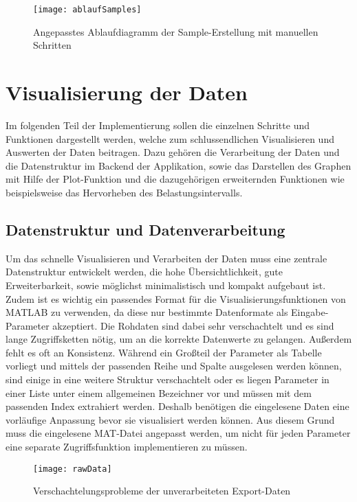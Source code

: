 \begin{figure}[H]
	\centering
	\texttt{[image: ablaufSamples]}
	\caption{Angepasstes Ablaufdiagramm der Sample-Erstellung mit manuellen Schritten}
	\label{fig:ablaufSamples}
\end{figure}

\section{Visualisierung der Daten}

Im folgenden Teil der Implementierung sollen die einzelnen Schritte und Funktionen dargestellt werden, welche zum schlussendlichen Visualisieren und Auswerten der Daten beitragen. Dazu gehören die Verarbeitung der Daten und die Datenstruktur im Backend der Applikation, sowie das Darstellen des Graphen mit Hilfe der Plot-Funktion und die dazugehörigen erweiternden Funktionen wie beispielsweise das Hervorheben des Belastungsintervalls.

\subsection{Datenstruktur und Datenverarbeitung}

Um das schnelle Visualisieren und Verarbeiten der Daten muss eine zentrale Datenstruktur entwickelt werden, die hohe Übersichtlichkeit, gute Erweiterbarkeit, sowie möglichst minimalistisch und kompakt aufgebaut ist. Zudem ist es wichtig ein passendes Format für die Visualisierungsfunktionen von MATLAB zu verwenden, da diese nur bestimmte Datenformate als Eingabe-Parameter akzeptiert. Die Rohdaten sind dabei sehr verschachtelt und es sind lange Zugriffsketten nötig, um an die korrekte Datenwerte zu gelangen. Außerdem fehlt es oft an Konsistenz. Während ein Großteil der Parameter als Tabelle vorliegt und mittels der passenden Reihe und Spalte ausgelesen werden können, sind einige in eine weitere Struktur verschachtelt oder es liegen Parameter in einer Liste unter einem allgemeinen Bezeichner vor und müssen mit dem passenden Index extrahiert werden. Deshalb benötigen die eingelesene Daten eine vorläufige Anpassung bevor sie visualisiert werden können. Aus diesem Grund muss die eingelesene MAT-Datei angepasst werden, um nicht für jeden Parameter eine separate Zugriffsfunktion implementieren zu müssen.

\begin{figure}[H]
	\centering
	\texttt{[image: rawData]}
	\caption{Verschachtelungsprobleme der unverarbeiteten Export-Daten}
	\label{fig:rawData}
\end{figure}

